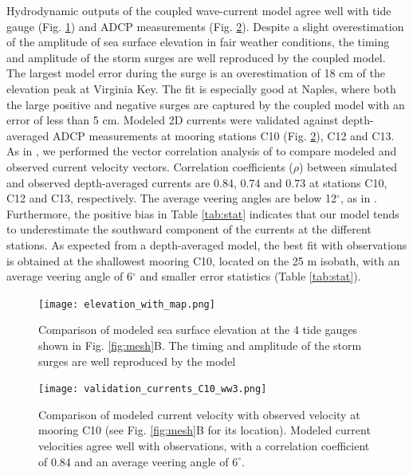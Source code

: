 \documentclass[preprint,12pt,authoryear]{elsarticle}
\begin{document}
Hydrodynamic outputs of the coupled wave-current model agree well with tide gauge (Fig. \ref{fig:sse}) and ADCP measurements (Fig. \ref{fig:uv}). Despite a slight overestimation of the amplitude of sea surface elevation in fair weather conditions, the timing and amplitude of the storm surges are well reproduced by the coupled model. The largest model error during the surge is an overestimation of 18 cm of the elevation peak at Virginia Key. The fit is especially good at Naples, where both the large positive and negative surges are captured by the coupled model with an error of less than 5 cm. Modeled 2D currents were validated against depth-averaged ADCP measurements at mooring stations C10 (Fig. \ref{fig:uv}), C12 and C13. As in \cite{liu2020impacts}, we performed the vector correlation analysis of \cite{kundu1976ekman} to compare modeled and observed current velocity vectors. Correlation coefficients ($\rho$) between simulated and observed depth-averaged currents are 0.84, 0.74 and 0.73 at stations C10, C12 and C13, respectively. The average veering angles are below 12$^\circ$, as in \citep{liu2020impacts}. Furthermore, the positive bias in Table \ref{tab:stat} indicates that our model tends to underestimate the southward component of the currents at the different stations. As expected from a depth-averaged model, the best fit with observations is obtained at the shallowest mooring C10, located on the 25 m isobath, with an average veering angle of 6$^\circ$ and smaller error statistics (Table \ref{tab:stat}). 

\begin{figure}
    \centering
    \texttt{[image: elevation\_with\_map.png]}
    \caption{Comparison of modeled sea surface elevation at the 4 tide gauges shown in Fig. \ref{fig:mesh}B. The timing and amplitude of the storm surges are well reproduced by the model}
    \label{fig:sse}
\end{figure}
\begin{figure}
    \texttt{[image: validation\_currents\_C10\_ww3.png]}
    \caption{Comparison of modeled current velocity with observed velocity at mooring C10 (see Fig. \ref{fig:mesh}B for its location). Modeled current velocities agree well with observations, with a correlation coefficient of 0.84 and an average veering angle of $6^\circ$.}
    \label{fig:uv}
\end{figure}
\end{document}
